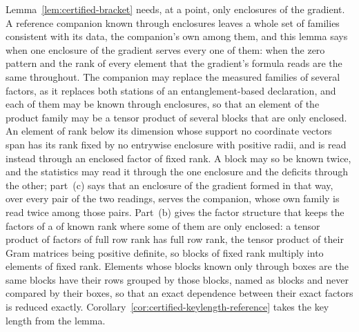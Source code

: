 Lemma~\ref{lem:certified-bracket} needs, at a point, only enclosures of the
gradient. A reference companion known through enclosures leaves a whole set of
families consistent with its data, the companion's own among them, and this
lemma says when one enclosure of the gradient serves every one of them: when
the zero pattern and the rank of every element that the gradient's formula
reads are the same throughout. The companion may replace the measured
families of several factors, as it replaces both stations of an
entanglement-based declaration, and each of them may be known through
enclosures, so that an element of the product family may be a tensor product
of several blocks that are only enclosed. An element of rank below its
dimension whose support no coordinate vectors span has its rank fixed by no
entrywise enclosure with positive radii, and is read instead through an
enclosed factor of fixed rank. A block may so be
known twice, and the statistics may read it through the one enclosure and the
deficits through the other; part~(c) says that an enclosure of the gradient
formed in that way, over every pair of the two readings, serves the companion,
whose own family is read twice among those pairs. Part~(b) gives the factor
structure that keeps the factors of a  of known rank where
some of them are only enclosed: a tensor product of factors of full row rank
has full row rank, the tensor product of their Gram matrices being positive
definite, so blocks of fixed rank multiply into elements of fixed rank.
Elements whose blocks known only through boxes are the same blocks have
their rows grouped by those blocks, named as blocks and never compared by
their boxes, so that an exact dependence between their exact factors is
reduced exactly.
Corollary~\ref{cor:certified-keylength-reference} takes the key length from
the lemma.

